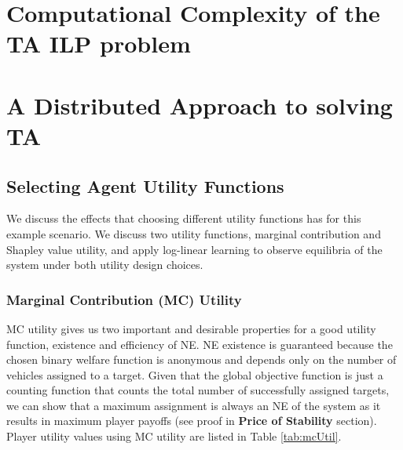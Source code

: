 \documentclass[11pt, onecolumn, compsoc, letterpaper]{article}
\begin{document}
\section{Computational Complexity of the TA ILP problem}



\section{A Distributed Approach to solving TA}


\subsection{Selecting Agent Utility Functions}
We discuss the effects that choosing different utility functions has for this example scenario. We discuss two utility functions, marginal contribution and Shapley value utility, and apply log-linear learning to observe equilibria of the system under both utility design choices.

\subsubsection{Marginal Contribution (MC) Utility}
MC utility gives us two important and desirable properties for a good utility function, existence and efficiency of NE. NE existence is guaranteed because the chosen binary welfare function is anonymous and  depends only on the number of vehicles assigned to a target\cite{Monderer1996}. Given that the global objective function is just a counting function that counts the total number of successfully assigned targets, we can show that a maximum assignment is always an NE of the system as it results in maximum player payoffs (see proof in \textbf{Price of Stability} section). Player utility values using MC utility are listed in Table \ref{tab:mcUtil}.  
\end{document}
